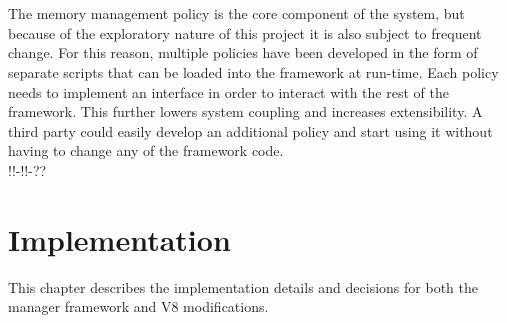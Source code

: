 \documentclass{l4proj}
\begin{document}
\\\\
\hspace*{3em} The memory management policy is the core component of the system, but because of the exploratory nature of this project it is also subject to frequent change. For this reason, multiple policies have been developed in the form of separate scripts that can be loaded into the framework at run-time. Each policy needs to implement an interface in order to interact with the rest of the framework. This further lowers system coupling and increases extensibility. A third party could easily develop an additional policy and start using it without having to change any of the framework code.
\\!!-!!-??
\newpage
\chapter{Implementation}
\hspace*{3em} This chapter describes the implementation details and decisions for both the manager framework and V8 modifications. 
\end{document}
